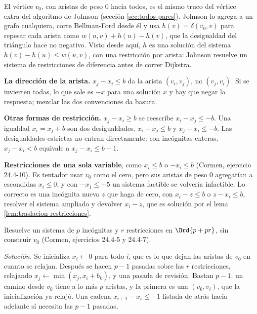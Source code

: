 \documentclass[11pt,letterpaper]{article}
\begin{document}
\begin{observacion}
  El vértice $v_0$, con aristas de peso $0$ hacia todos, es el mismo
  truco del vértice extra del algoritmo de Johnson (sección
  \ref{sec:todos-pares}). Johnson lo agrega a un grafo cualquiera,
  corre Bellman-Ford desde él y usa $h(v) = \delta(v_0, v)$ para
  repesar cada arista como $w(u, v) + h(u) - h(v)$, que la desigualdad
  del triángulo hace no negativo. Visto desde aquí, $h$ es una
  solución del sistema $h(v) - h(u) \le w(u, v)$, con una restricción
  por arista: Johnson resuelve un sistema de restricciones de
  diferencia antes de correr Dijkstra.
\end{observacion}

\begin{ojo}
  \textbf{La dirección de la arista.} $x_j - x_i \le b$ da la arista
  $(v_i, v_j)$, no $(v_j, v_i)$. Si se invierten todas, lo que sale es
  $-x$ para una solución $x$ y hay que negar la respuesta; mezclar las
  dos convenciones da basura.

  \smallskip
  \textbf{Otras formas de restricción.} $x_j - x_i \ge b$ se reescribe
  $x_i - x_j \le -b$. Una igualdad $x_i = x_j + b$ son dos
  desigualdades, $x_i - x_j \le b$ y $x_j - x_i \le -b$. Las
  desigualdades estrictas no entran directamente; con incógnitas
  enteras, $x_j - x_i < b$ equivale a $x_j - x_i \le b - 1$.

  \smallskip
  \textbf{Restricciones de una sola variable}, como $x_i \le b$ o
  $-x_i \le b$ (Cormen, ejercicio 24.4-10). Es tentador usar $v_0$
  como el cero, pero sus aristas de peso $0$ agregarían a escondidas
  $x_i \le 0$, y con $-x_1 \le -5$ un sistema factible se volvería
  infactible. Lo correcto es una incógnita nueva $z$ que haga de cero,
  con $x_i - z \le b$ o $z - x_i \le b$, resolver el sistema ampliado
  y devolver $x_i - z$, que es solución por el lema
  \ref{lem:traslacion-restricciones}.
\end{ojo}

\begin{ejercicio}\label{ej:restricciones-rapido}
  Resuelve un sistema de $p$ incógnitas y $r$ restricciones en
  $\Ord{p + pr}$, sin construir $v_0$ (Cormen, ejercicios 24.4-5 y
  24.4-7).

  \textit{Solución.} Se inicializa $x_i \gets 0$ para todo $i$, que es
  lo que dejan las aristas de $v_0$ en cuanto se relajan. Después se
  hacen $p - 1$ pasadas sobre las $r$ restricciones, relajando
  $x_j \gets \min(x_j, x_i + b_k)$, y una pasada de revisión. Bastan
  $p - 1$: un camino desde $v_0$ tiene a lo más $p$ aristas, y la
  primera es una $(v_0, v_i)$, que la inicialización ya relajó. Una
  cadena $x_{i+1} - x_i \le -1$ listada de atrás hacia adelante sí
  necesita las $p - 1$ pasadas.
\end{ejercicio}
\end{document}
